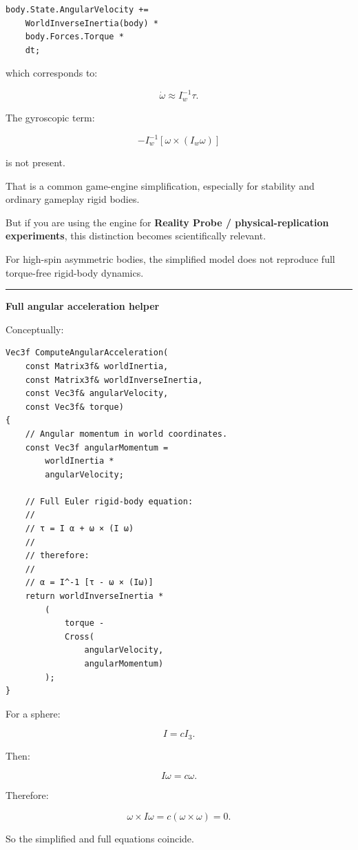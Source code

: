 \begin{verbatim}
body.State.AngularVelocity +=
    WorldInverseInertia(body) *
    body.Forces.Torque *
    dt;
\end{verbatim}

which corresponds to:

\[
\dot\omega
\approx
I_w^{-1}\tau.
\]

The gyroscopic term:

\[
-I_w^{-1}
[
\omega\times(I_w\omega)
]
\]

is not present.

That is a common game-engine simplification, especially for stability and ordinary gameplay rigid bodies.

But if you are using the engine for \textbf{Reality Probe / physical-replication experiments}, this distinction becomes scientifically relevant.

For high-spin asymmetric bodies, the simplified model does not reproduce full torque-free rigid-body dynamics.

\begin{center}\rule{0.5\linewidth}{0.5pt}\end{center}

\textbf{Full angular acceleration helper}

Conceptually:

\begin{verbatim}
Vec3f ComputeAngularAcceleration(
    const Matrix3f& worldInertia,
    const Matrix3f& worldInverseInertia,
    const Vec3f& angularVelocity,
    const Vec3f& torque)
{
    // Angular momentum in world coordinates.
    const Vec3f angularMomentum =
        worldInertia *
        angularVelocity;

    // Full Euler rigid-body equation:
    //
    // τ = I α + ω × (I ω)
    //
    // therefore:
    //
    // α = I^-1 [τ - ω × (Iω)]
    return worldInverseInertia *
        (
            torque -
            Cross(
                angularVelocity,
                angularMomentum)
        );
}
\end{verbatim}

For a sphere:

\[
I=cI_3.
\]

Then:

\[
I\omega=c\omega.
\]

Therefore:

\[
\omega\times I\omega
=
c(\omega\times\omega)
=
0.
\]

So the simplified and full equations coincide.

